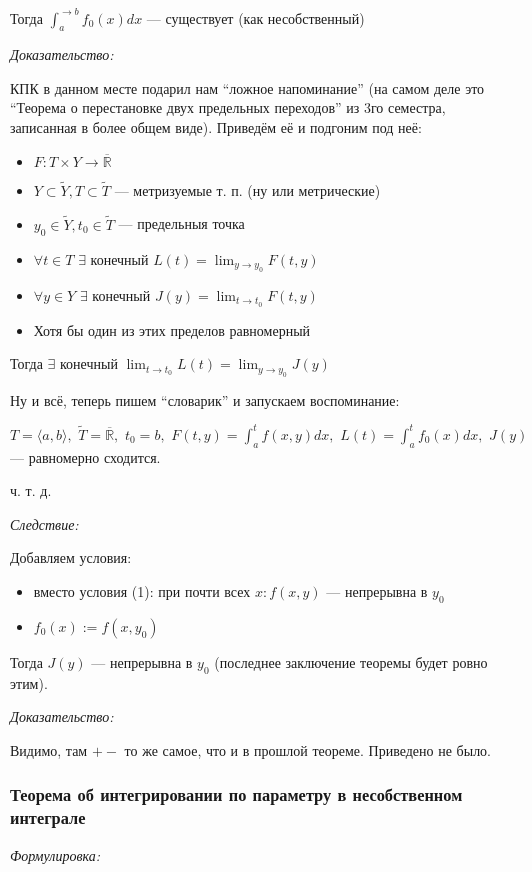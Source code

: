 \documentclass{article}
\def\dbl{\,\,}
\def\rinf{\overline{\mathbb{R}}}
\begin{document}
Тогда $\int_a^{\rightarrow b} f_0(x) dx$ --- существует (как несобственный)

\textit{Доказательство:}

КПК в данном месте подарил нам ``ложное напоминание'' (на самом деле это ``Теорема о перестановке двух предельных переходов'' из 3го семестра, записанная в более общем виде). Приведём её и подгоним под неё:

\begin{itemize}
    \item $F: T \times Y \rightarrow \rinf$
    \item $Y \subset \tilde{Y}, T \subset \tilde{T}$ --- метризуемые т. п. (ну или метрические)
    \item $y_0 \in \tilde{Y}, t_0 \in \tilde{T}$ --- предельныя точка
    \item $\forall t \in T \dbl \exists$ конечный $L(t) = \lim_{y \rightarrow y_0} F(t, y)$
    \item $\forall y \in Y \dbl \exists$ конечный $J(y) = \lim_{t \rightarrow t_0} F(t, y)$
    \item Хотя бы один из этих пределов равномерный
\end{itemize}

Тогда $\exists$ конечный $\lim_{t \rightarrow t_0} L(t) = \lim_{y \rightarrow y_0} J(y)$

Ну и всё, теперь пишем ``словарик'' и запускаем воспоминание:

$T = \langle a, b\rangle, \dbl \tilde{T} = \rinf, \dbl t_0 = b, \dbl F(t, y) = \int_a^t f(x, y) dx, \dbl L(t) = \int_a^t f_0(x) dx, \dbl J(y)$ --- равномерно сходится.

ч. т. д. 

\textit{Следствие: }

Добавляем условия:

\begin{itemize}
    \item вместо условия (1): при почти всех $x: f(x, y)$ --- непрерывна в $y_0$
    \item $f_0(x) := f(x, y_0)$
\end{itemize}

Тогда $J(y)$ --- непрерывна в $y_0$ (последнее заключение теоремы будет ровно этим).

\textit{Доказательство:}

Видимо, там $+-$ то же самое, что и в прошлой теореме. Приведено не было.

\subsubsection{Теорема об интегрировании по параметру в несобственном интеграле}
\textit{Формулировка:}
\end{document}
